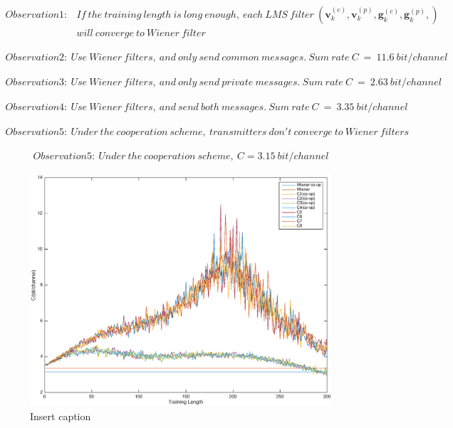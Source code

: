 \documentclass[11pt, oneside]{article}   	%
\begin{document}
\begin{align*}
Observation1: &If\ the\ training\ length\ is\ long\ enough,\ each\ LMS\ filter\ (\textbf{v}^{(c)}_{k},\textbf{v}^{(p)}_{k},\textbf{g}^{(c)}_{k},\textbf{g}^{(p)}_{k},)\\
&will\ converge\ to\ Wiener\ filter
\end{align*}

\begin{align*}
Observation2:\ Use\ Wiener\ filters,\ and\ only\ send\ common\ messages.\ Sum\ rate\ C\ =\ 11.6\ bit/channel
\end{align*}

\begin{align*}
Observation3:\ Use\ Wiener\ filters,\ and\ only\ send\ private\ messages.\ Sum\ rate\ C\ =\ 2.63\ bit/channel
\end{align*}

\begin{align*}
Observation4:\ Use\ Wiener\ filters,\ and\  send\ both\ messages.\ Sum\ rate\ C\ =\ 3.35\ bit/channel
\end{align*}

\begin{align*}
Observation5:\ Under\ the\ cooperation\ scheme,\ transmitters\ don't\ converge\ to\ Wiener\ filters 
\end{align*}

\begin{align*}
Observation5:\ Under\ the\ cooperation\ scheme,\ C=3.15\ bit/channel
\end{align*}



\begin{figure}[bp!]
    \centering
    \includegraphics[width=150mm]{01}
    \caption{Insert caption}
\end{figure} 
\end{document}
